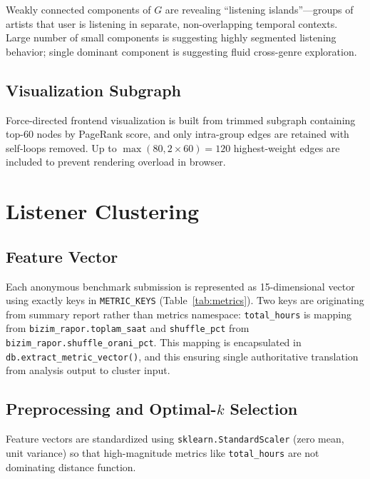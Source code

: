 \documentclass[conference]{IEEEtran}
\begin{document}
Weakly connected components of $G$ are revealing ``listening islands''---groups of artists that user is listening in separate, non-overlapping temporal contexts. Large number of small components is suggesting highly segmented listening behavior; single dominant component is suggesting fluid cross-genre exploration.

\subsection{Visualization Subgraph}

Force-directed frontend visualization is built from trimmed subgraph containing top-60 nodes by PageRank score, and only intra-group edges are retained with self-loops removed. Up to $\max(80, 2 \times 60) = 120$ highest-weight edges are included to prevent rendering overload in browser.

\section{Listener Clustering}

\subsection{Feature Vector}

Each anonymous benchmark submission is represented as 15-dimensional vector using exactly keys in \texttt{METRIC\_KEYS} (Table~\ref{tab:metrics}). Two keys are originating from summary report rather than metrics namespace: \texttt{total\_hours} is mapping from \texttt{bizim\_rapor.toplam\_saat} and \texttt{shuffle\_pct} from \texttt{bizim\_rapor.shuffle\_orani\_pct}. This mapping is encapsulated in \texttt{db.extract\_metric\_vector()}, and this ensuring single authoritative translation from analysis output to cluster input.

\subsection{Preprocessing and Optimal-\texorpdfstring{$k$}{k} Selection}

Feature vectors are standardized using \texttt{sklearn.StandardScaler} (zero mean, unit variance) so that high-magnitude metrics like \texttt{total\_hours} are not dominating distance function.
\end{document}
